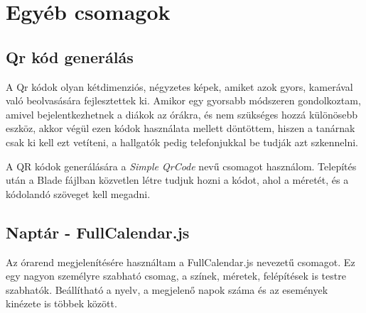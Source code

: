 \documentclass[
]{thesis-ekf}
\theoremstyle{definition}
\theoremstyle{remark}
\begin{document}


\section{Egyéb csomagok}

\subsection{Qr kód generálás}

A Qr kódok olyan kétdimenziós, négyzetes képek, amiket azok gyors, kamerával való beolvasására fejlesztettek ki.\cite{qrCodeWhatIsIt} Amikor egy gyorsabb módszeren gondolkoztam, amivel bejelentkezhetnek a diákok az órákra, és nem szükséges hozzá különösebb eszköz, akkor végül ezen kódok használata mellett döntöttem, hiszen a tanárnak csak ki kell ezt vetíteni, a hallgatók pedig telefonjukkal be tudják azt szkennelni.

A QR kódok generálására a \emph{Simple QrCode}\cite{qrCode} nevű csomagot használom. Telepítés után a Blade fájlban közvetlen létre tudjuk hozni a kódot, ahol a méretét, és a kódolandó szöveget kell megadni.



\subsection{Naptár - FullCalendar.js}

Az órarend megjelenítésére használtam a FullCalendar.js\cite{fullcalendar} nevezetű csomagot. Ez egy nagyon személyre szabható csomag, a színek, méretek, felépítések is testre szabhatók. Beállítható a nyelv, a megjelenő napok száma és az események kinézete is többek között.
\end{document}
